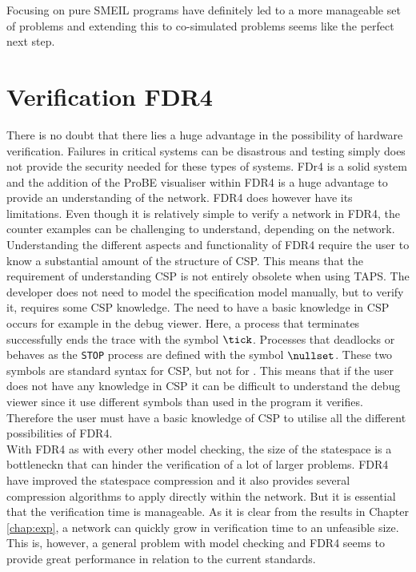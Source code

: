 Focusing on pure SMEIL programs have definitely led to a more manageable set of problems and extending this to co-simulated problems seems like the perfect next step.

\section{Verification FDR4}
There is no doubt that there lies a huge advantage in the possibility of hardware verification. Failures in critical systems can be disastrous and testing simply does not provide the security needed for these types of systems. FDr4 is a solid system and the addition of the ProBE visualiser within FDR4 is a huge advantage to provide an understanding of the network. FDR4 does however have its limitations. Even though it is relatively simple to verify a network in FDR4, the counter examples can be challenging to understand, depending on the network. Understanding the different aspects and functionality of FDR4 require the user to know a substantial amount of the structure of CSP. This means that the requirement of understanding CSP is not entirely obsolete when using TAPS. The developer does not need to model the specification model manually, but to verify it, requires some CSP knowledge. The need to have a basic knowledge in CSP occurs for example in the debug viewer. Here, a process that terminates successfully ends the trace with the symbol $\tick$. Processes that deadlocks or behaves as the \texttt{STOP} process are defined with the symbol $\nullset$. These two symbols are standard syntax for CSP, but not for \cspm{}. This means that if the user does not have any knowledge in CSP it can be difficult to understand the debug viewer since it use different symbols than used in the \cspm{} program it verifies. Therefore the user must have a basic knowledge of CSP to utilise all the different possibilities of FDR4. \\

With FDR4 as with every other model checking, the size of the statespace is a bottleneckn that can hinder the verification of a lot of larger problems. FDR4 have improved the statespace compression and it also provides several compression algorithms to apply directly within the \cspm{} network. But it is essential that the verification time is manageable. As it is clear from the results in Chapter \ref{chap:exp}, a network can quickly grow in verification time to an unfeasible size. This is, however, a general problem with model checking and FDR4 seems to provide great performance in relation to the current standards.